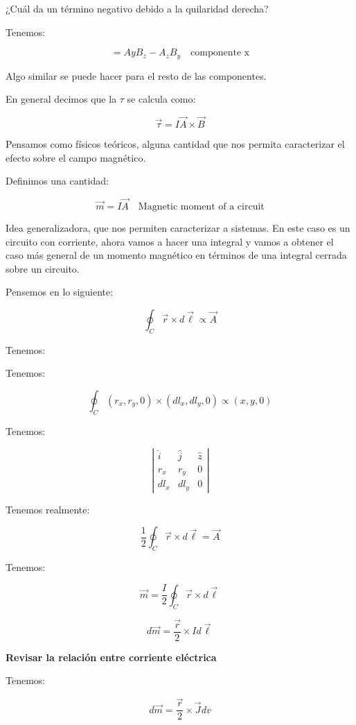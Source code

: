 \documentclass{article}
\begin{document}
¿Cuál da un término negativo debido a la quilaridad derecha?

Tenemos:

\[  = AyB_{z}-A_{z}B_{y} \quad \text{componente x}  \]


Algo similar se puede hacer para el resto de las componentes. 

En general decimos que la $\tau$ se calcula como:


\[ \boxed{\vec{\tau} = I \vec{A} \times \vec{B}}  \]



Pensamos como físicos teóricos, alguna cantidad que nos permita caracterizar el efecto sobre el campo magnético.


Definimos una cantidad:


\[  \boxed{ \vec{m} = I\vec{A}  } \quad \text{Magnetic moment of a circuit}  \]

Idea generalizadora, que nos permiten caracterizar a sistemas. En este caso es un circuito con corriente, ahora vamos a hacer una integral y vamos a obtener el caso más general de un momento magnético en términos de una integral cerrada sobre un circuito.


Pensemos en lo siguiente:





\[ \oint_{C} \vec{r} \times d\vec{\ell} \propto \vec{A} \]

Tenemos:


Tenemos:


\[  \oint_{C} (r_{x},r_{y},0) \times (dl_{x},dl_{y},0)  \propto (x,y,0)\]

Tenemos:


\[ \left|\begin{array}{ccc}
\hat{i} & \hat{j} & \hat{z}\\
r_{x} & r_{y} & 0\\
dl_{x} & dl_{y} & 0
\end{array} \right|   \]


Tenemos realmente:



\[ \frac{1}{2} \oint_{C} \vec{r} \times d\vec{\ell} = \vec{A} \]




Tenemos:


\[    \vec{m} = \frac{I}{2} \oint_{C} \vec{r} \times d\vec{\ell}   \]

\[ d\vec{m} = \frac{\vec{r}}{2} \times Id\vec{\ell}  \]

\textbf{Revisar la relación entre corriente eléctrica}

Tenemos:


\[\boxed{ d\vec{m} = \frac{\vec{r}}{2} \times \vec{J}dv}   \]
\end{document}

